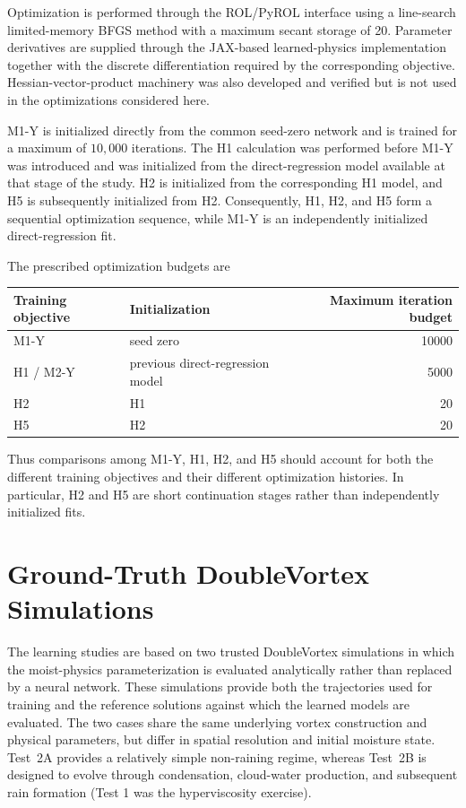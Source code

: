 \documentclass[12pt]{article}
\begin{document}
Optimization is performed through the ROL/PyROL interface using a
line-search limited-memory BFGS method with a maximum secant storage of 20.
Parameter derivatives are supplied through the JAX-based learned-physics
implementation together with the discrete differentiation required by the
corresponding objective. Hessian-vector-product machinery was also developed
and verified but is not used in the optimizations considered here.

M1-Y is initialized directly from the common seed-zero network and is trained
for a maximum of $10{,}000$ iterations. The H1 calculation was performed
before M1-Y was introduced and was initialized from the direct-regression
model available at that stage of the study. H2 is initialized from the
corresponding H1 model, and H5 is subsequently initialized from H2.
Consequently, H1, H2, and H5 form a sequential optimization sequence, while
M1-Y is an independently initialized direct-regression fit.

The prescribed optimization budgets are
\begin{center}
	\begin{tabular}{l|l|r}
		Training objective & Initialization & Maximum iteration budget \\
		\hline
		M1-Y & seed zero & 10000 \\
		H1 / M2-Y & previous direct-regression model & 5000 \\
		H2 & H1 & 20 \\
		H5 & H2 & 20
	\end{tabular}
\end{center}

Thus comparisons among M1-Y, H1, H2, and H5 should account for both the
different training objectives and their different optimization histories.
In particular, H2 and H5 are short continuation stages rather than
independently initialized fits.

\section{Ground-Truth DoubleVortex Simulations}\label{sec:PhysicalSims}

The learning studies are based on two trusted DoubleVortex simulations in
which the moist-physics parameterization is evaluated analytically rather than
replaced by a neural network. These simulations provide both the trajectories
used for training and the reference solutions against which the learned models
are evaluated. The two cases share the same underlying vortex construction and
physical parameters, but differ in spatial resolution and initial moisture
state. Test~2A provides a relatively simple non-raining regime, whereas
Test~2B is designed to evolve through condensation, cloud-water production,
and subsequent rain formation (Test 1 was the hyperviscosity exercise).
\end{document}
